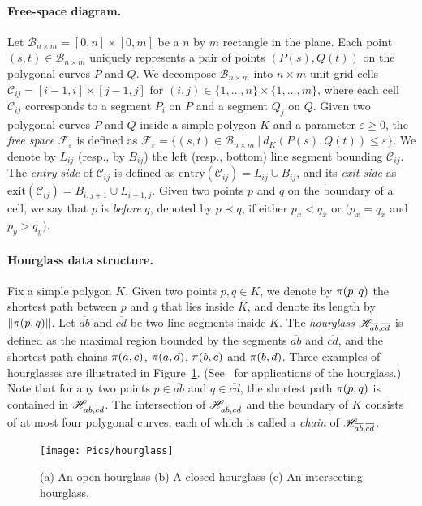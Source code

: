 \documentclass[12pt]{dalthesis}
\newcommand{\lee}{\leqslant}
\newcommand{\gee}{\geqslant}
\newcommand{\set}[1]{{\{ #1 \}}}
\newcommand{\eps}{\varepsilon}
\newcommand{\CF}{{\mathscr F}}
\newcommand{\CB}{{\mathscr B}}
\newcommand{\CC}{{\mathscr C}}
\newcommand{\cell}[1]{{\CC_{#1}}}
\newcommand{\BNM}{\CB_{n \times m}}
\newcommand{\Feps}{\CF_\eps}
\newcommand{\entry}[1]{\mbox{entry}(\cell{#1})}
\newcommand{\exit}[1]{\mbox{exit}(\cell{#1})}
\newcommand{\lei}{\prec}
\newcommand{\Ov}[1]{\overline{#1}}
\begin{document}
\paragraph{Free-space diagram.}
Let $\BNM = [0,n] \times [0,m]$ be a $n$ by $m$ rectangle  in the plane.
Each point $(s,t) \in \BNM$ uniquely represents a pair of points
$(P(s),Q(t))$ on the polygonal curves $P$ and $Q$.
We decompose $\BNM$ into
$n\times m$ unit grid cells $\cell{ij} = [i-1,i] \times [j-1,j]$
for $(i,j) \in \set{1, \ldots, n} \times \set{1, \ldots, m}$,
where each cell $\cell{ij}$ corresponds to
a segment $P_i$ on $P$ and a segment $Q_j$ on $Q$.
Given  two polygonal curves $P$ and $Q$ inside a simple polygon $K$
and a parameter $\eps \gee 0$,
the {\em free space\/} $\Feps$ is defined as
$
	\Feps = \{(s,t) \in \BNM \ | \ d_K(P(s),Q(t)) \lee \eps \}.
$
We denote by $L_{ij}$ (resp., by $B_{ij}$) the left (resp., bottom) line segment bounding $\cell{ij}$. 
The {\em entry side\/} of $\cell{ij}$ is defined as $\entry{ij} = L_{ij} \cup B_{ij}$,
and its {\em exit side\/} as $\exit{ij} = B_{i,j+1} \cup L_{i+1,j}$. 
Given two points $p$ and $q$ on the boundary of a cell, we say that 
$p$ is {\em before\/} $q$, denoted by $p \lei q$, if either $p_x < q_x$ or 
$(p_x = q_x$ and $p_y > q_y)$.



\paragraph{Hourglass data structure.}
Fix a simple polygon $K$.
Given two points $p,q \in K$, 
we denote by $\pi(p,q)$ the shortest path 
between $p$ and $q$ that lies inside $K$,
and denote its length by  $\| \pi(p,q) \|$.
Let $\Ov{ab}$ and $\Ov{cd}$ 
be two 
line segments inside $K$.
The \emph{hourglass} ${\mathscr H}_{\overline{ab},\overline{cd}}$
is defined as the maximal region bounded by 
the segments $\Ov{ab}$ and $\Ov{cd}$, 
and the shortest path chains $\pi(a,c)$, $\pi(a,d)$, $\pi(b,c)$ and $\pi(b,d)$.
Three examples of hourglasses are illustrated in Figure~\ref{fig:OpenH}.
(See~\cite{Guibas86} for applications of the hourglass.)
Note that for any two points $p \in \Ov{ab}$ and $q \in \Ov{cd}$,
the shortest path $\pi(p,q)$ is contained in ${\mathscr H}_{\overline{ab},\overline{cd}}$.
The intersection of ${\mathscr H}_{\overline{ab},\overline{cd}}$ and the boundary of $K$
consists of at most four polygonal curves,
each of which is called a \emph{chain} of ${\mathscr H}_{\overline{ab},\overline{cd}}$.



\begin{figure}[h]
	\centering
	\texttt{[image: Pics/hourglass]}
	\caption{ (a) An open hourglass (b) A closed hourglass (c) An intersecting hourglass.
	}
	\label{fig:OpenH}
\end{figure}
\end{document}
